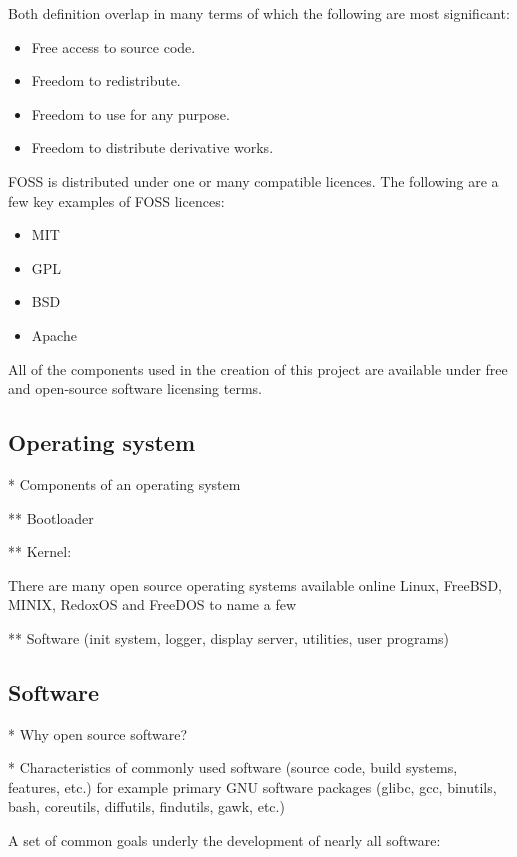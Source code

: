 Both definition overlap in many terms of which the following are most significant:

\begin{itemize}
    \item Free access to source code.
    \item Freedom to redistribute.
    \item Freedom to use for any purpose.
    \item Freedom to distribute derivative works.
\end{itemize}

FOSS is distributed under one or many compatible licences. The following are a few key examples of FOSS licences:

\begin{itemize}
    \item MIT
    \item GPL
    \item BSD
    \item Apache
\end{itemize}

All of the components used in the creation of this project are available under free and open-source software licensing terms.

\subsection{Operating system}

* Components of an operating system

** Bootloader

** Kernel:

There are many open source operating systems available online Linux, FreeBSD, MINIX, RedoxOS and FreeDOS to name a few 

** Software (init system, logger, display server, utilities, user programs)

\subsection{Software}

* Why open source software?

* Characteristics of commonly used software (source code, build systems, features, etc.) for example primary GNU software packages (glibc, gcc, binutils, bash, coreutils, diffutils, findutils, gawk, etc.)

A set of common goals underly the development of nearly all software:

